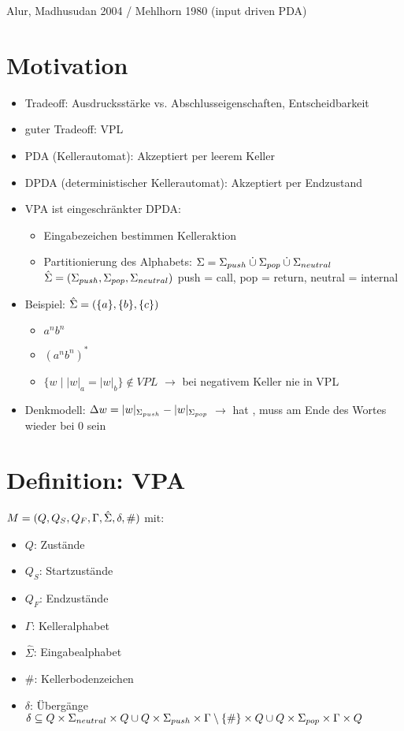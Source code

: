 Alur, Madhusudan 2004 / Mehlhorn 1980 (input driven PDA)
\section{Motivation}
    \begin{itemize}
        \item Tradeoff: Ausdrucksstärke vs. Abschlusseigenschaften, Entscheidbarkeit
        \item guter Tradeoff: VPL
        \item PDA (Kellerautomat): Akzeptiert per leerem Keller
        \item DPDA (deterministischer Kellerautomat): Akzeptiert per Endzustand
        \item VPA ist eingeschränkter DPDA:
        \begin{itemize}
            \item Eingabezeichen bestimmen Kelleraktion
            \item Partitionierung des Alphabets:
            \subitem $\Sigma=\Sigma_{push}\mathbin{\dot{\cup}}\Sigma_{pop}\mathbin{\dot{\cup}}\Sigma_{neutral}$
            \subitem $\hat{\Sigma}=\left(\Sigma_{push},\Sigma_{pop},\Sigma_{neutral}\right)$
            \subitem push = call, pop = return, neutral = internal
        \end{itemize}
        \item Beispiel: $\hat{\Sigma}=\left(\{a\},\{b\},\{c\}\right)$
        \begin{itemize}
            \item $a^nb^n$
            \item $(a^nb^n)^*$
            \item $\{w\mid|w|_a=|w|_b\}\not\in VPL$
            \subitem $\rightarrow$ bei negativem Keller nie in VPL
        \end{itemize}
        \item Denkmodell: $\Delta w=|w|_{\Sigma_{push}}-|w|_{\Sigma_{pop}}$
        \subitem $\rightarrow$ hat , muss am Ende des Wortes wieder bei 0 sein
    \end{itemize}
\section{Definition: VPA}
    $M=(Q,Q_S,Q_F,\Gamma,\hat{\Sigma},\delta,\#)$ mit:
    \begin{itemize}
        \item $Q$: Zustände
        \item $Q_S$: Startzustände
        \item $Q_F$: Endzustände
        \item $\Gamma$: Kelleralphabet
        \item $\hat\Sigma$: Eingabealphabet
        \item $\#$: Kellerbodenzeichen
        \item $\delta$: Übergänge
        \subitem $\delta \subseteq Q\times \Sigma_{neutral} \times Q \\\cup Q\times \Sigma_{push} \times \Gamma\setminus\{\#\}\times Q\\\cup Q\times \Sigma_{pop} \times\Gamma\times Q$
    \end{itemize}

